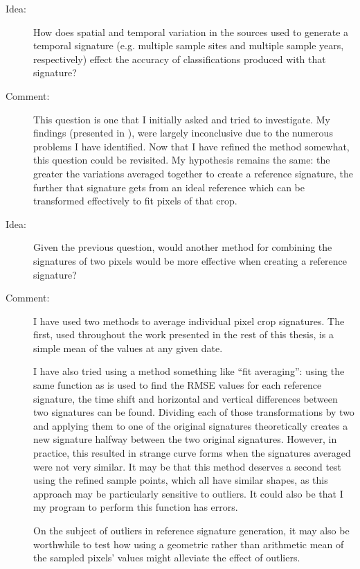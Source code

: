 \begin{description}
\item[Idea:] How does spatial and temporal variation in the sources used to generate a temporal signature (e.g. multiple sample sites and multiple sample years, respectively) effect the accuracy of classifications produced with that signature?

\item[Comment:] This question is one that I initially asked and tried to investigate. My findings (presented in 
), were largely inconclusive due to the numerous problems I have identified. Now that I have refined the method somewhat, this question could be revisited. My hypothesis remains the same: the greater the variations averaged together to create a reference signature, the further that signature gets from an ideal reference which can be transformed effectively to fit pixels of that crop.

\item[Idea:] Given the previous question, would another method for combining the signatures of two pixels would be more effective when creating a reference signature?

\item[Comment:] I have used two methods to average individual pixel crop signatures. The first, used throughout the work presented in the rest of this thesis, is a simple mean of the values at any given date.

I have also tried using a method something like “fit averaging”: using the same function as is used to find the RMSE values for each reference signature, the time shift and horizontal and vertical differences between two signatures can be found. Dividing each of those transformations by two and applying them to one of the original signatures theoretically creates a new signature halfway between the two original signatures. However, in practice, this resulted in strange curve forms when the signatures averaged were not very similar. It may be that this method deserves a second test using the refined sample points, which all have similar shapes, as this approach may be particularly sensitive to outliers. It could also be that I my program to perform this function has errors.

On the subject of outliers in reference signature generation, it may also be worthwhile to test how using a geometric rather than arithmetic mean of the sampled pixels’ values might alleviate the effect of outliers.
\end{description}

